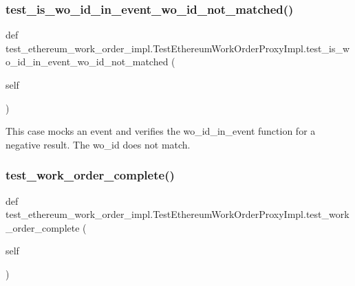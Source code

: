 \subsubsection{\texorpdfstring{test\+\_\+is\+\_\+wo\+\_\+id\+\_\+in\+\_\+event\+\_\+wo\+\_\+id\+\_\+not\+\_\+matched()}{test\_is\_wo\_id\_in\_event\_wo\_id\_not\_matched()}}
{\footnotesize\ttfamily def test\+\_\+ethereum\+\_\+work\+\_\+order\+\_\+impl.\+Test\+Ethereum\+Work\+Order\+Proxy\+Impl.\+test\+\_\+is\+\_\+wo\+\_\+id\+\_\+in\+\_\+event\+\_\+wo\+\_\+id\+\_\+not\+\_\+matched (\begin{DoxyParamCaption}\item[{}]{self }\end{DoxyParamCaption})}

\begin{DoxyVerb}This case mocks an event and verifies the wo_id_in_event function
for a negative result. The wo_id does not match.
\end{DoxyVerb}
 \mbox{\label{classtest__ethereum__work__order__impl_1_1TestEthereumWorkOrderProxyImpl_a35411737dc8d8b17fe713d1c21bafaa1}} 
\subsubsection{\texorpdfstring{test\+\_\+work\+\_\+order\+\_\+complete()}{test\_work\_order\_complete()}}
{\footnotesize\ttfamily def test\+\_\+ethereum\+\_\+work\+\_\+order\+\_\+impl.\+Test\+Ethereum\+Work\+Order\+Proxy\+Impl.\+test\+\_\+work\+\_\+order\+\_\+complete (\begin{DoxyParamCaption}\item[{}]{self }\end{DoxyParamCaption})}


